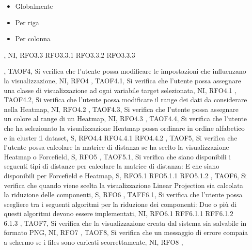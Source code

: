 {{{\begin{itemize}
                \item Globalmente
                \item Per riga
                \item Per colonna
            \end{itemize}},
            NI,
            RFO3.3 RFO3.3.1 RFO3.3.2 RFO3.3.3
        },
        {   
            TAOF4,
            Si verifica che l'utente possa modificare le impostazioni che influenzano la visualizzazione,
            NI,
            RFO4
        },
        {   
            TAOF4.1,
            Si verifica che l'utente possa assegnare una classe di visualizzazione ad ogni variabile target selezionata,
            NI,
            RFO4.1
        },
        {   
            TAOF4.2,
            Si verifica che l'utente possa modificare il range dei dati da considerare nella Heatmap,
            NI,
            RFO4.2
        },
        {   
            TAOF4.3,
            Si verifica che l'utente possa assegnare un colore al range di un Heatmap,
            NI,
            RFO4.3
        },
        {   
            TAOF4.4,
            Si verifica che l'utente che ha selezionato la visualizzazione Heatmap possa ordinare in ordine alfabetico e in cluster il dataset,
            S,
            RFO4.4 RFO4.4.1 RFO4.4.2
        },
        {   
            TAOF5,
            Si verifica che l'utente possa calcolare la matrice di distanza se ha scelto la visualizzazione Heatmap o Forcefield,
            S,
            RFO5
        },    
        {   
            TAOF5.1,
            Si verifica che siano disponibili i seguenti tipi di distanze per calcolare la matrice di distanza:
            E che siano disponibili per Forcefield e Heatmap,
            S,
            RFO5.1 RFO5.1.1 RFO5.1.2
        },
        {   
            TAOF6,
            Si verifica che quando viene scelta la visualizzazione Linear Projection sia calcolata la riduzione delle componenti,
            S,
            RFO6
        },
        {   
            TAFF6.1,
            Si verifica che l'utente possa scegliere tra i seguenti algoritmi per la riduzione dei componenti:
            Due o più di questi algoritmi devono essere implementati,
            NI,
            RFO6.1 RFF6.1.1 RFF6.1.2 6.1.3
        },
        {   
            TAOF7,
            Si verifica che la visualizzazione creata dal sistema sia salvabile in formato PNG,
            NI,
            RFO7
        },
        {   
            TAOF8,
            Si verifica che un messaggio di errore compaia a schermo se i files sono caricati scorrettamente,
            NI,
            RFO8
        },
        }
